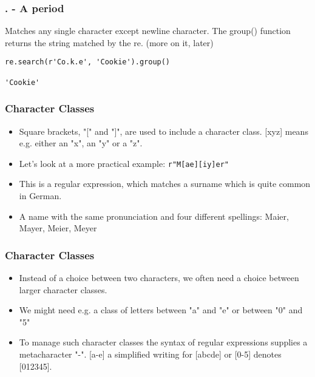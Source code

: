  \begin{frame}[fragile]
\frametitle{. - A period}
Matches any single character except newline character. The group() function returns the string matched by the re. (more on it, later)

\begin{lstlisting}
re.search(r'Co.k.e', 'Cookie').group()

'Cookie'
\end{lstlisting}

\end{frame}



 \begin{frame}[fragile]
\frametitle{Character Classes}

\begin{itemize}
\item Square brackets, "[" and "]", are used to include a character class. [xyz] means e.g. either an "x", an "y" or a "z". 
\item Let's look at a more practical example: \lstinline|r"M[ae][iy]er"|
\item This is a regular expression, which matches a surname which is quite common in German. 
\item A name with the same pronunciation and four different spellings: Maier, Mayer, Meier, Meyer 
\end{itemize}
\end{frame}

 \begin{frame}[fragile]
\frametitle{Character Classes}

\begin{itemize}
\item Instead of a choice between two characters, we often need a choice between larger character classes. 
\item We might need e.g. a class of letters between "a" and "e" or between "0" and "5"
\item To manage such character classes the syntax of regular expressions supplies a metacharacter "-". [a-e] a simplified writing for [abcde] or [0-5] denotes [012345]. 
\end{itemize}
\end{frame}


